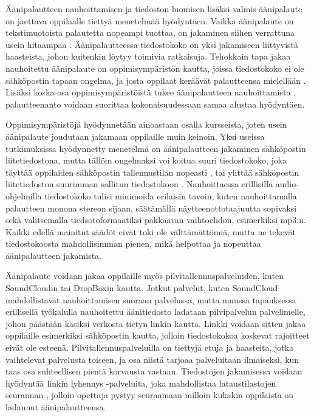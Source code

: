 \documentclass[utf8]{gradu3}
\begin{document}
Äänipalautteen nauhoittamisen ja tiedoston luomisen lisäksi valmis äänipalaute on jaettava oppilaalle tiettyä menetelmää hyödyntäen. Vaikka äänipalaute on tekstimuotoista palautetta nopeampi tuottaa, on jakaminen siihen verrattuna usein hitaampaa \parencite[][]{evaluating}. Äänipalautteessa tiedostokoko on yksi jakamiseen liittyvistä haasteista, johon kuitenkin löytyy toimivia ratkaisuja. Tehokkain tapa jakaa nauhoitettu äänipalaute on oppimisympäristön kautta, joissa tiedostokoko ei ole sähköpostin tapaan ongelma, ja josta oppilaat keräävät palautteensa mielellään \parencite[][]{areYouListening}. Lisäksi koska osa oppimisympäristöistä tukee äänipalautteen nauhoittamista \parencite[][]{using}, palautteenanto  voidaan suorittaa kokonaisuudessaan samaa alustaa hyödyntäen. 

Oppimisympäristöjä hyödynnetään ainoastaan osalla kursseista, joten usein äänipalaute joudutaan jakamaan oppilaille muin keinoin. Yksi useissa tutkimuksissa hyödynnetty menetelmä on äänipalautteen jakaminen sähköpostin liitetiedostona, mutta tällöin ongelmaksi voi koitua suuri tiedostokoko, joka täyttää oppilaiden sähköpostin tallennustilan nopeasti \parencite[][]{developing}, tai ylittää sähköpostin liitetiedoston suurimman sallitun tiedostokoon \parencite[][]{versus}. Nauhoittaessa erillisillä audio-ohjelmilla tiedostokoko tulisi minimoida erilaisin tavoin, kuten nauhoittamalla palautteen monona stereon sijaan, säätämällä näytteenottotaajuutta sopivaksi \parencite[][]{voice} sekä valitsemalla tiedsotoformaatiksi pakkaavan vaihtoehdon, esimerkiksi mp3:n. Kaikki edellä mainitut säädöt eivät toki ole välttämättömiä, mutta ne tekevät tiedostokoosta mahdollisimman pienen, mikä helpottaa ja nopeuttaa äänipalautteen jakamista. 

Äänipalaute voidaan jakaa oppilaille myös pilvitallennuspalveluiden, kuten SoundCloudin tai DropBoxin kautta. Jotkut palvelut, kuten SoundCloud mahdollistavat nauhoittamisen suoraan palvelussa, mutta muussa tapauksessa erillisellä työkalulla nauhoitettu äänitiedosto ladataan pilvipalvelun palvelimelle, johon päästään käsiksi verkosta tietyn linkin kautta. Linkki voidaan sitten jakaa oppilaille esimerkiksi sähköpostin kautta, jolloin tiedostokokoa koskevat rajoitteet eivät ole esteenä. Pilvitallennuspalveluilla on tiettyjä etuja ja haasteita, jotka vaihtelevat palvelusta toiseen, ja osa niistä tarjoaa palveluitaan ilmaiseksi, kun taas osa suhteellisen pientä korvausta vastaan. Tiedostojen jakamisessa voidaan hyödyntää linkin lyhennys -palveluita, joka mahdollistaa lataustilastojen seurannan \parencite[][]{engaging}, jolloin opettaja pystyy seuraamaan milloin kukakin oppilaista on ladannut äänipalautteensa.
\end{document}
